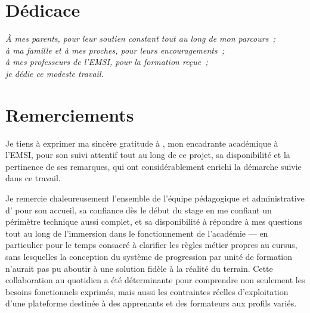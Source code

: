 \documentclass[12pt,a4paper,oneside]{report}
\begin{document}


\setcounter{page}{1}

\chapter*{Dédicace}
\vspace{2cm}
\begin{center}
\itshape\large
À mes parents, pour leur soutien constant tout au long de mon parcours~;\\[1em]
à ma famille et à mes proches, pour leurs encouragements~;\\[1em]
à mes professeurs de l'EMSI, pour la formation reçue~;\\[1em]
je dédie ce modeste travail.
\end{center}

\clearpage
\chapter*{Remerciements}

Je tiens à exprimer ma sincère gratitude à \EncadrantPedago, mon encadrante
académique à l'EMSI, pour son suivi attentif tout au long de ce projet, sa
disponibilité et la pertinence de ses remarques, qui ont considérablement
enrichi la démarche suivie dans ce travail.

Je remercie chaleureusement l'ensemble de l'équipe pédagogique et
administrative d'\Entreprise{} pour son accueil, sa confiance dès le début
du stage en me confiant un périmètre technique aussi complet, et sa
disponibilité à répondre à mes questions tout au long de l'immersion dans
le fonctionnement de l'académie --- en particulier pour le temps consacré à
clarifier les règles métier propres au cursus, sans lesquelles la
conception du système de progression par unité de formation n'aurait pas pu
aboutir à une solution fidèle à la réalité du terrain. Cette collaboration
au quotidien a été déterminante pour comprendre non seulement les besoins
fonctionnels exprimés, mais aussi les contraintes réelles d'exploitation
d'une plateforme destinée à des apprenants et des formateurs aux profils
variés.
\end{document}
